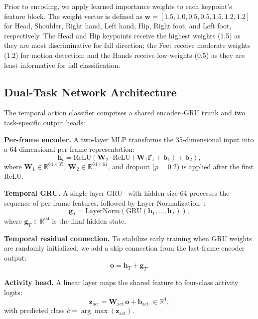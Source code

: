 Prior to encoding, we apply learned importance weights to each keypoint's feature block. The weight vector is defined as $\mathbf{w} = [1.5, 1.0, 0.5, 0.5, 1.5, 1.2, 1.2]$ for Head, Shoulder, Right hand, Left hand, Hip, Right foot, and Left foot, respectively. The Head and Hip keypoints receive the highest weights (1.5) as they are most discriminative for fall direction; the Feet receive moderate weights (1.2) for motion detection; and the Hands receive low weights (0.5) as they are least informative for fall classification.

\subsection{Dual-Task Network Architecture}
\label{subsec:action_arch}

The temporal action classifier comprises a shared encoder--GRU trunk and two task-specific output heads:

\textbf{Per-frame encoder.} A two-layer MLP transforms the 35-dimensional input into a 64-dimensional per-frame representation:
\begin{equation}
    \mathbf{h}_t = \text{ReLU}\!\left(\mathbf{W}_2 \cdot \text{ReLU}\!\left(\mathbf{W}_1 \mathbf{f}'_t + \mathbf{b}_1\right) + \mathbf{b}_2\right),
    \label{eq:per_frame_enc}
\end{equation}
where $\mathbf{W}_1 \in \mathbb{R}^{64 \times 35}$, $\mathbf{W}_2 \in \mathbb{R}^{64 \times 64}$, and dropout ($p = 0.2$) is applied after the first ReLU.

\textbf{Temporal GRU.} A single-layer GRU~\cite{cho2014learning} with hidden size 64 processes the sequence of per-frame features, followed by Layer Normalization~\cite{ba2016layernorm}:
\begin{equation}
    \mathbf{g}_T = \text{LayerNorm}\!\left(\text{GRU}(\mathbf{h}_1, \ldots, \mathbf{h}_T)\right),
    \label{eq:gru}
\end{equation}
where $\mathbf{g}_T \in \mathbb{R}^{64}$ is the final hidden state.

\textbf{Temporal residual connection.} To stabilize early training when GRU weights are randomly initialized, we add a skip connection from the last-frame encoder output:
\begin{equation}
    \mathbf{o} = \mathbf{h}_T + \mathbf{g}_T.
    \label{eq:temporal_residual}
\end{equation}

\textbf{Activity head.} A linear layer maps the shared feature to four-class activity logits:
\begin{equation}
    \mathbf{z}_\text{act} = \mathbf{W}_\text{act}\, \mathbf{o} + \mathbf{b}_\text{act} \;\in \mathbb{R}^{4},
    \label{eq:activity_logits}
\end{equation}
with predicted class $\hat{c} = \arg\max(\mathbf{z}_\text{act})$.

